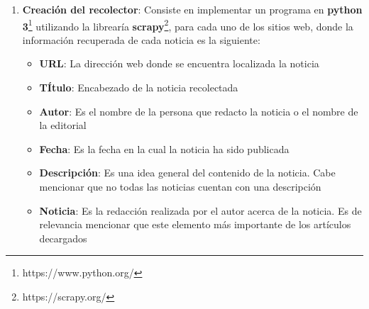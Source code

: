 \begin{enumerate}
  Una expresión \textit{XPath} de ruta permite buscar y seleccionar los distintos nodos de un documento XML. En el  Cuadro \ref{box:xml} se muestra un ejemplo con los elementos de una nota, los cuales son: \textbf{para}, \textbf{de}, \textbf{titulo}, \textbf{texto}, estos son los nodos que conforman una nota.\\


\begin{mygraybox}[label={box:xml}]{XML} 

\begin{tabbing}
<nota> \= \\\kill
\>  <para>Daniel</para>\\
\>  <de>Andres</de>\\
\>  <titulo>Recordatorio</titulo>\\
\>  <texto>Despertar temprano.</texto>\\
</nota>
\end{tabbing}

\end{mygraybox}

La expresión \textit{XPath} que permite extraer el contenido de la etiqueta \textbf{<texto> </texto>} se muestra en el Cuadro \ref{box:xpathEjemplo}: \\

\begin{mygraybox}[label={box:xpathEjemplo}]{Expresión XPath} 
\textbf{/nota/texto/text()}
\end{mygraybox}
\ \\

  \item \textbf{Creación del recolector}: Consiste en implementar un programa en \textbf{python 3}\footnote{https://www.python.org/} utilizando la librearía  \textbf{scrapy}\footnote{https://scrapy.org/}, para cada uno de los sitios web, donde la información recuperada de cada noticia es la siguiente:\\

  \begin{itemize}
  \item \textbf{URL}: La dirección web donde se encuentra localizada la noticia 
  \item \textbf{TÍtulo}: Encabezado de la noticia recolectada
  \item \textbf{Autor}: Es el nombre de la persona que redacto la noticia o el nombre de la editorial
  \item \textbf{Fecha}: Es la fecha en la cual la noticia ha sido publicada
  \item \textbf{Descripción}: Es una idea general del contenido de la noticia. Cabe mencionar que no todas las noticias cuentan con una descripción
  \item \textbf{Noticia}: Es la redacción realizada por el autor acerca de la noticia. Es de relevancia mencionar que este elemento más importante de los artículos decargados\\ 
\end{itemize}




\end{enumerate}
